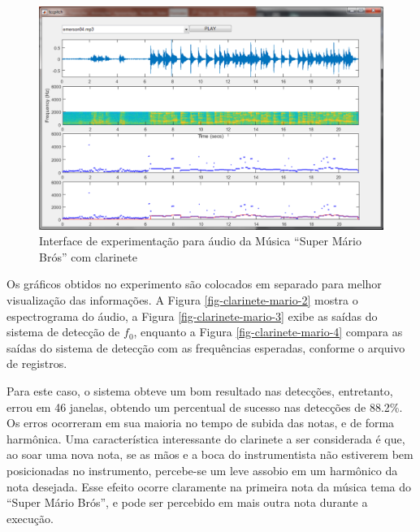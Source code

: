 \begin{figure}
	\centering
	\includegraphics[width=0.75\linewidth]{pasta1_figuras/clarinete-mario.png}
	\caption{Interface de experimentação para áudio da Música ``Super Mário Brós'' com clarinete}
	\label{fig-clarinete-mario}
\end{figure}

Os gráficos obtidos no experimento são colocados em separado para melhor visualização das informações. A Figura \ref{fig-clarinete-mario-2} mostra o espectrograma do áudio, a Figura \ref{fig-clarinete-mario-3} exibe as saídas do sistema de detecção de $f_0$, enquanto a Figura \ref{fig-clarinete-mario-4} compara as saídas do sistema de detecção com as frequências esperadas, conforme o arquivo de registros.


Para este caso, o sistema obteve um bom resultado nas detecções, entretanto, errou em 46 janelas, obtendo um percentual de sucesso nas detecções de 88.2\%. Os erros ocorreram em sua maioria no tempo de subida das notas, e de forma harmônica. Uma característica interessante do clarinete a ser considerada é que, ao soar uma nova nota, se as mãos e a boca do instrumentista não estiverem bem posicionadas no instrumento, percebe-se um leve assobio em um harmônico da nota desejada. Esse efeito ocorre claramente na primeira nota da música tema do ``Super Mário Brós'', e pode ser percebido em mais outra nota durante a execução.

